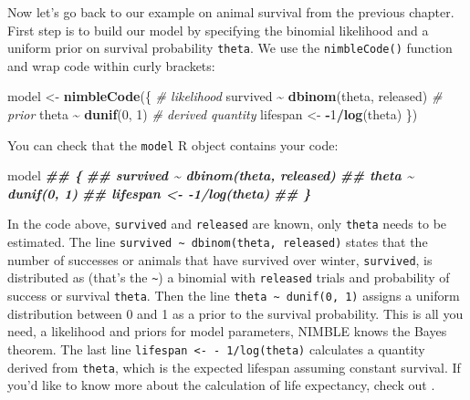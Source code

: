 \documentclass[
  12pt,
]{krantz}
\newenvironment{Shaded}{\begin{snugshade}}{\end{snugshade}}
\newcommand{\CommentTok}[1]{\textcolor[rgb]{0.56,0.35,0.01}{\textit{#1}}}
\newcommand{\DecValTok}[1]{\textcolor[rgb]{0.00,0.00,0.81}{#1}}
\newcommand{\DocumentationTok}[1]{\textcolor[rgb]{0.56,0.35,0.01}{\textbf{\textit{#1}}}}
\newcommand{\FunctionTok}[1]{\textcolor[rgb]{0.13,0.29,0.53}{\textbf{#1}}}
\newcommand{\NormalTok}[1]{#1}
\newcommand{\OtherTok}[1]{\textcolor[rgb]{0.56,0.35,0.01}{#1}}
\newcommand{\SpecialCharTok}[1]{\textcolor[rgb]{0.81,0.36,0.00}{\textbf{#1}}}
\begin{document}
Now let's go back to our example on animal survival from the previous chapter. First step is to build our model by specifying the binomial likelihood and a uniform prior on survival probability \texttt{theta}. We use the \texttt{nimbleCode()} function and wrap code within curly brackets:

\begin{Shaded}
\begin{Highlighting}[]
\NormalTok{model }\OtherTok{\textless{}{-}} \FunctionTok{nimbleCode}\NormalTok{(\{}
  \CommentTok{\# likelihood}
\NormalTok{  survived }\SpecialCharTok{\textasciitilde{}} \FunctionTok{dbinom}\NormalTok{(theta, released)}
  \CommentTok{\# prior}
\NormalTok{  theta }\SpecialCharTok{\textasciitilde{}} \FunctionTok{dunif}\NormalTok{(}\DecValTok{0}\NormalTok{, }\DecValTok{1}\NormalTok{)}
  \CommentTok{\# derived quantity}
\NormalTok{  lifespan }\OtherTok{\textless{}{-}} \SpecialCharTok{{-}}\DecValTok{1}\SpecialCharTok{/}\FunctionTok{log}\NormalTok{(theta)}
\NormalTok{\})}
\end{Highlighting}
\end{Shaded}

You can check that the \texttt{model} R object contains your code:

\begin{Shaded}
\begin{Highlighting}[]
\NormalTok{model}
\DocumentationTok{\#\# \{}
\DocumentationTok{\#\#     survived \textasciitilde{} dbinom(theta, released)}
\DocumentationTok{\#\#     theta \textasciitilde{} dunif(0, 1)}
\DocumentationTok{\#\#     lifespan \textless{}{-} {-}1/log(theta)}
\DocumentationTok{\#\# \}}
\end{Highlighting}
\end{Shaded}

In the code above, \texttt{survived} and \texttt{released} are known, only \texttt{theta} needs to be estimated. The line \texttt{survived\ \textasciitilde{}\ dbinom(theta,\ released)} states that the number of successes or animals that have survived over winter, \texttt{survived}, is distributed as (that's the \texttt{\textasciitilde{}}) a binomial with \texttt{released} trials and probability of success or survival \texttt{theta}. Then the line \texttt{theta\ \textasciitilde{}\ dunif(0,\ 1)} assigns a uniform distribution between 0 and 1 as a prior to the survival probability. This is all you need, a likelihood and priors for model parameters, NIMBLE knows the Bayes theorem. The last line \texttt{lifespan\ \textless{}-\ -\ 1/log(theta)} calculates a quantity derived from \texttt{theta}, which is the expected lifespan assuming constant survival. If you'd like to know more about the calculation of life expectancy, check out \citet{cook1967expectancy}.
\end{document}
